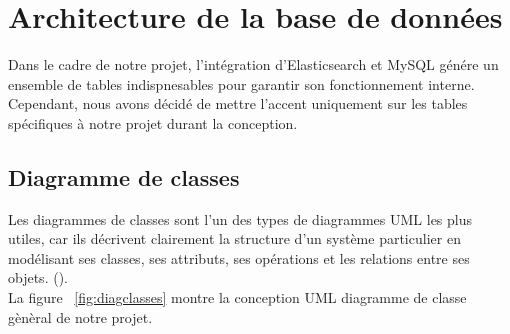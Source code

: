 \section{Architecture de la base de données}
\noindent
Dans le cadre de notre projet, l'intégration d'Elasticsearch et MySQL génére un ensemble de tables indispnesables pour garantir son fonctionnement interne. Cependant, nous avons décidé de mettre l'accent uniquement sur les tables
spécifiques à notre projet durant la conception.

\subsection{Diagramme de classes}
\noindent
Les diagrammes de classes sont l'un des types de diagrammes UML les plus utiles, car ils décrivent clairement la structure d’un système particulier en modélisant ses classes, ses attributs, ses opérations et les relations entre ses objets.  (\cite{lucidcharts:classdiagram}). \\
La figure ~\ref{fig:diagclasses} montre la conception UML diagramme de classe gènèral de notre projet.

